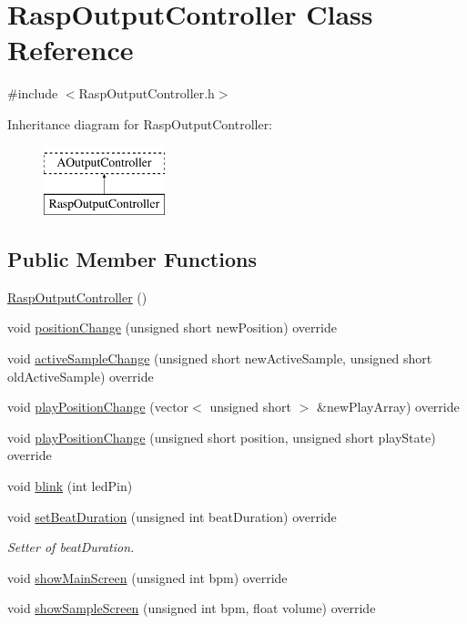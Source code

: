 \hypertarget{class_rasp_output_controller}{}\section{Rasp\+Output\+Controller Class Reference}
\label{class_rasp_output_controller}


{\ttfamily \#include $<$Rasp\+Output\+Controller.\+h$>$}

Inheritance diagram for Rasp\+Output\+Controller\+:\begin{figure}[H]
\begin{center}
\leavevmode
\includegraphics[height=2.000000cm]{class_rasp_output_controller}
\end{center}
\end{figure}
\subsection*{Public Member Functions}
\begin{DoxyCompactItemize}
\item 
\hyperlink{class_rasp_output_controller_afd7487de7ff81c6b092f4072d4fa80a5}{Rasp\+Output\+Controller} ()
\item 
void \hyperlink{class_rasp_output_controller_afce87d510c0564567e4250b22639d5e0}{position\+Change} (unsigned short new\+Position) override
\item 
void \hyperlink{class_rasp_output_controller_a92954cf26d4dd5f7d8835d1d508302c0}{active\+Sample\+Change} (unsigned short new\+Active\+Sample, unsigned short old\+Active\+Sample) override
\item 
void \hyperlink{class_rasp_output_controller_af0304196681872f9c1f6d6f2e2db14a6}{play\+Position\+Change} (vector$<$ unsigned short $>$ \&new\+Play\+Array) override
\item 
void \hyperlink{class_rasp_output_controller_a0778395ee8ec044d04fbfcb2f3b2eb04}{play\+Position\+Change} (unsigned short position, unsigned short play\+State) override
\item 
void \hyperlink{class_rasp_output_controller_a23987d33142c3c09abf8126773f32d99}{blink} (int led\+Pin)
\item 
void \hyperlink{class_rasp_output_controller_a5fd551f1aba056356befd71e5bff23f1}{set\+Beat\+Duration} (unsigned int beat\+Duration) override
\begin{DoxyCompactList}\small\item\em Setter of beat\+Duration. \end{DoxyCompactList}\item 
void \hyperlink{class_rasp_output_controller_ad195a3d664b7c7e5680cd8949203c1fc}{show\+Main\+Screen} (unsigned int bpm) override
\item 
void \hyperlink{class_rasp_output_controller_a613d3a1d1ceb31875be95e4a4b733fba}{show\+Sample\+Screen} (unsigned int bpm, float volume) override
\end{DoxyCompactItemize}

